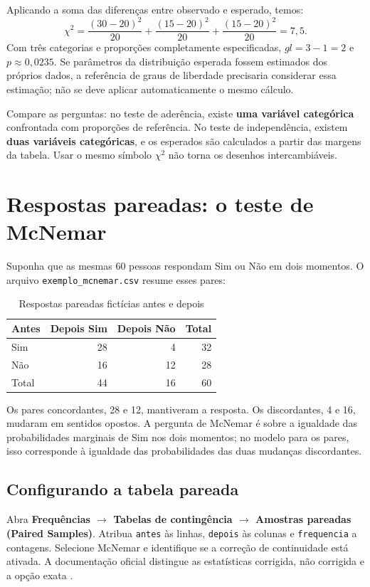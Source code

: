 Aplicando a soma das diferenças entre observado e esperado, temos:
\[
\chi^2=\frac{(30-20)^2}{20}+\frac{(15-20)^2}{20}
+\frac{(15-20)^2}{20}=7{,}5.
\]
Com três categorias e proporções completamente especificadas, $gl=3-1=2$ e $p\approx0{,}0235$. Se parâmetros da distribuição esperada fossem estimados dos próprios dados, a referência de graus de liberdade precisaria considerar essa estimação; não se deve aplicar automaticamente o mesmo cálculo.

Compare as perguntas: no teste de aderência, existe \textbf{uma variável categórica} confrontada com proporções de referência. No teste de independência, existem \textbf{duas variáveis categóricas}, e os esperados são calculados a partir das margens da tabela. Usar o mesmo símbolo $\chi^2$ não torna os desenhos intercambiáveis.

\section{Respostas pareadas: o teste de McNemar}
\label{sec:mcnemar}

Suponha que as mesmas 60 pessoas respondam Sim ou Não em dois momentos. O arquivo \texttt{exemplo\_mcnemar.csv} resume esses pares:

\begin{table}[H]
\centering
\caption{Respostas pareadas fictícias antes e depois}
\begin{tabular}{lrrr}
\hline
Antes & Depois Sim & Depois Não & Total \\
\hline
Sim & 28 & 4 & 32 \\
Não & 16 & 12 & 28 \\
\hline
Total & 44 & 16 & 60 \\
\hline
\end{tabular}
\label{tab:mcnemar}
\end{table}

Os pares concordantes, 28 e 12, mantiveram a resposta. Os discordantes, 4 e 16, mudaram em sentidos opostos. A pergunta de McNemar é sobre a igualdade das probabilidades marginais de Sim nos dois momentos; no modelo para os pares, isso corresponde à igualdade das probabilidades das duas mudanças discordantes.

\subsection{Configurando a tabela pareada}

Abra \textbf{Frequências $\rightarrow$ Tabelas de contingência $\rightarrow$ Amostras pareadas (Paired Samples)}. Atribua \texttt{antes} às linhas, \texttt{depois} às colunas e \texttt{frequencia} a contagens. Selecione McNemar e identifique se a correção de continuidade está ativada. A documentação oficial distingue as estatísticas corrigida, não corrigida e a opção exata \parencite{JamoviMcNemar}.

